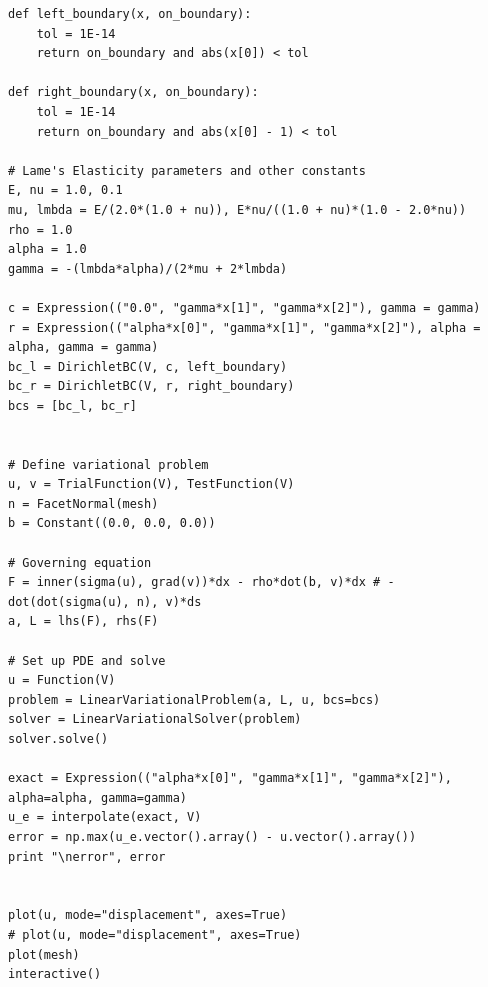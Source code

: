 \documentclass[twoside]{article}
\begin{document}
\begin{lstlisting}
def left_boundary(x, on_boundary):
	tol = 1E-14
	return on_boundary and abs(x[0]) < tol

def right_boundary(x, on_boundary):
	tol = 1E-14
	return on_boundary and abs(x[0] - 1) < tol

# Lame's Elasticity parameters and other constants
E, nu = 1.0, 0.1
mu, lmbda = E/(2.0*(1.0 + nu)), E*nu/((1.0 + nu)*(1.0 - 2.0*nu))
rho = 1.0
alpha = 1.0
gamma = -(lmbda*alpha)/(2*mu + 2*lmbda)

c = Expression(("0.0", "gamma*x[1]", "gamma*x[2]"), gamma = gamma)
r = Expression(("alpha*x[0]", "gamma*x[1]", "gamma*x[2]"), alpha = alpha, gamma = gamma)
bc_l = DirichletBC(V, c, left_boundary)
bc_r = DirichletBC(V, r, right_boundary)
bcs = [bc_l, bc_r]


# Define variational problem
u, v = TrialFunction(V), TestFunction(V)
n = FacetNormal(mesh)
b = Constant((0.0, 0.0, 0.0))

# Governing equation
F = inner(sigma(u), grad(v))*dx - rho*dot(b, v)*dx # - dot(dot(sigma(u), n), v)*ds
a, L = lhs(F), rhs(F)

# Set up PDE and solve
u = Function(V)
problem = LinearVariationalProblem(a, L, u, bcs=bcs)
solver = LinearVariationalSolver(problem)
solver.solve()

exact = Expression(("alpha*x[0]", "gamma*x[1]", "gamma*x[2]"), alpha=alpha, gamma=gamma)
u_e = interpolate(exact, V)
error = np.max(u_e.vector().array() - u.vector().array())
print "\nerror", error


plot(u, mode="displacement", axes=True)
# plot(u, mode="displacement", axes=True)
plot(mesh)
interactive()
\end{lstlisting}
\end{document}
